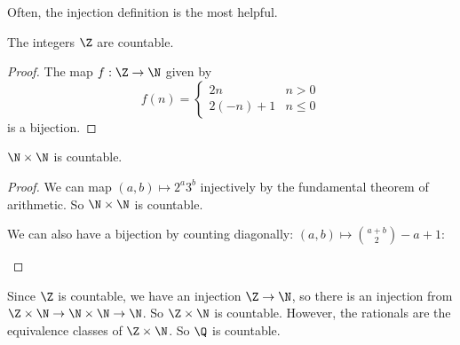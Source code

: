 \documentclass[a4paper]{article}
\begin{document}
Often, the injection definition is the most helpful.

\begin{prop}
  The integers $\Z$ are countable.
\end{prop}
\begin{proof}
  The map $f: \Z\to \N$ given by
  \[
    f(n) =
    \begin{cases}
      2n & n > 0\\
      2(-n) + 1 & n \leq 0
    \end{cases}
  \]
  is a bijection.
\end{proof}

\begin{prop}
  $\N \times \N$ is countable.
\end{prop}
\begin{proof}
  We can map $(a, b)\mapsto 2^a3^b$ injectively by the fundamental theorem of arithmetic. So $\N\times \N$ is countable.

  We can also have a bijection by counting diagonally: $(a, b) \mapsto \binom{a + b}{2} - a + 1$:

  \begin{center}

    \usetikzlibrary{decorations.markings}

  \end{center}
\end{proof}

Since $\Z$ is countable, we have an injection $\Z\to \N$, so there is an injection from $\Z\times \N\to \N\times \N \to \N$. So $\Z \times \N$ is countable. However, the rationals are the equivalence classes of $\Z\times\N$. So $\Q$ is countable.
\end{document}
